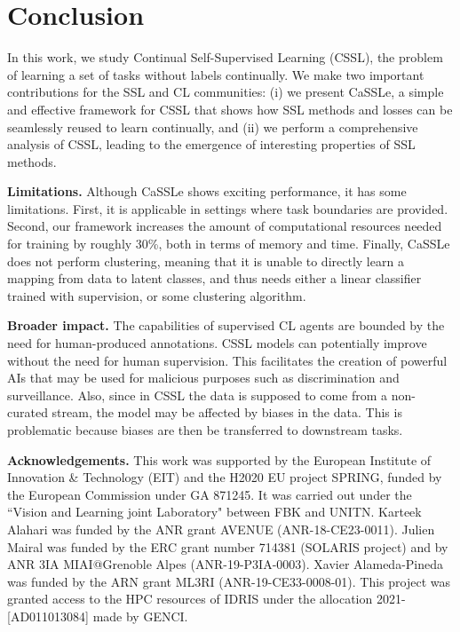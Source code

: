 \documentclass[10pt,twocolumn,letterpaper]{article}
\newcommand{\name}{CaSSLe}
\begin{document}
\vspace{-7pt}
\section{Conclusion}
\vspace{-8pt}
In this work, we study Continual Self-Supervised Learning (CSSL), the problem of learning a set of tasks without labels continually. We make two important contributions for the SSL and CL communities: (i) we present \name{}, a simple and effective framework for CSSL that shows how SSL methods and losses can be seamlessly reused to learn continually, and (ii) we perform a comprehensive analysis of CSSL, leading to the emergence of  interesting properties of SSL methods.

\noindent\textbf{Limitations.} Although \name{} shows exciting performance, it has some limitations. First, it is applicable in settings where task boundaries are provided. Second, our framework increases the amount of computational resources needed for training by roughly 30\%, both in terms of memory and time. Finally, \name{} does not perform clustering, meaning that it is unable to directly learn a mapping from data to latent classes, and thus needs either a linear classifier trained with supervision, or some clustering algorithm.

\noindent\textbf{Broader impact.} The capabilities of supervised CL agents are bounded by the need for human-produced annotations. CSSL models can potentially improve without the need for human supervision. This facilitates the creation of powerful AIs that may be used for malicious purposes such as discrimination and surveillance. Also, since in CSSL the data is supposed to come from a non-curated stream, the model may be affected by biases in the data. This is problematic because biases are then be transferred to downstream tasks.

\small{\noindent\textbf{Acknowledgements.} This work was supported by the European Institute of Innovation \& Technology (EIT) and the H2020 EU project SPRING, funded by the European Commission under GA 871245. It was carried out under the ``Vision and Learning joint Laboratory" between FBK and UNITN. Karteek Alahari was funded by the ANR grant AVENUE (ANR-18-CE23-0011). Julien Mairal was funded by the ERC grant number 714381 (SOLARIS project) and by ANR 3IA MIAI@Grenoble Alpes (ANR-19-P3IA-0003). Xavier Alameda-Pineda was funded by the ARN grant ML3RI (ANR-19-CE33-0008-01). This project was granted access to the HPC resources of IDRIS under the allocation 2021-[AD011013084] made by GENCI.}



{\small


}
\end{document}
